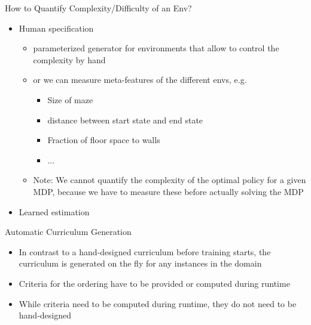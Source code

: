 \documentclass[aspectratio=169]{../latex_main/tntbeamer}  %
\begin{document}
\begin{frame}[c]{How to Quantify Complexity/Difficulty of an Env?}
	
	\begin{itemize}
		\item Human specification
		\begin{itemize}
			\item parameterized generator for environments that allow to control the complexity by hand
			\item or we can measure meta-features of the different envs, e.g.
			\begin{itemize}
				\item Size of maze
				\item distance between start state and end state
				\item Fraction of floor space to walls
				\item ...
			\end{itemize}
			\item Note: We cannot quantify the complexity of the optimal policy for a given MDP, because we have to measure these before actually solving the MDP
		\end{itemize}
		\item Learned estimation
	\end{itemize}
	

\end{frame}
\begin{frame}[c]{Automatic Curriculum Generation}
	
	\begin{itemize}
		\item In contrast to a hand-designed curriculum before training starts, the curriculum is generated on the fly for any instances in the domain
		\item Criteria for the ordering have to be provided or computed during runtime
		\item While criteria need to be computed during runtime, they do not need to be hand-designed
	\end{itemize}
	
\end{frame}
\end{document}
